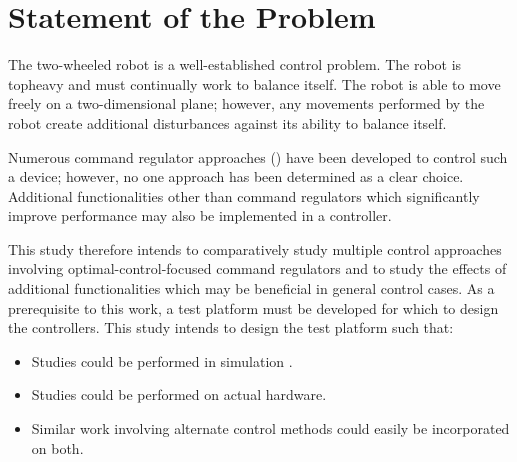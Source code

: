 \documentclass[crop=false,float=true,class=scrreprt]{standalone}
\begin{document}
\clearpage




\section{Statement of the Problem}

The two-wheeled robot is a well-established control problem.  
The robot is topheavy and must continually work to balance itself.
The robot is able to move freely on a two-dimensional plane; however,
any movements performed by the robot create additional disturbances
against its ability to balance itself.


Numerous command regulator approaches {\fns()} 
have been developed to control such a device;
however, no one approach has been determined as a clear choice.
Additional functionalities other than command regulators 
which significantly improve performance
may also be implemented in a controller.

This study therefore intends to comparatively study 
multiple control approaches involving optimal-control-focused command regulators
and to study the effects of additional functionalities which may be beneficial in general control cases.
As a prerequisite to this work, a test platform must be developed for which to design the controllers.
This study intends to design the test platform such that:

\vspace{-0.5em}

\begin{itemize}[leftmargin=*, label=$\vcenter{\hbox{\tiny$\bullet$}}$]

\item Studies could be performed in simulation {\fns{}}.

\item Studies could be performed on actual hardware.

\item Similar work involving alternate control methods could easily be incorporated on both.

\end{itemize}

\vspace{-0.5em}
\end{document}
